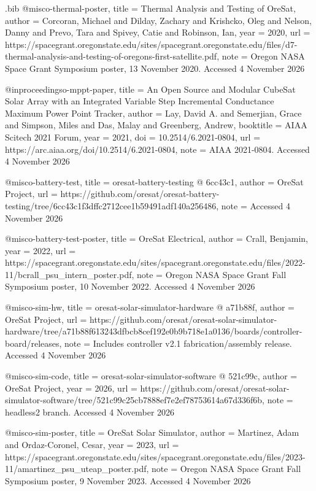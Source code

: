 \begin{filecontents*}[overwrite]{\jobname.bib}
@misc{o-thermal-poster,
  title = {{Thermal Analysis and Testing of OreSat}},
  author = {Corcoran, Michael and Dilday, Zachary and Krishcko, Oleg and Nelson, Danny and Prevo, Tara and Spivey, Catie and Robinson, Ian},
  year = {2020},
  url = {https://spacegrant.oregonstate.edu/sites/spacegrant.oregonstate.edu/files/d7-thermal-analysis-and-testing-of-oregons-first-satellite.pdf},
  note = {Oregon NASA Space Grant Symposium poster, 13 November 2020. Accessed 4 November 2026}
}

@inproceedings{o-mppt-paper,
  title = {{An Open Source and Modular CubeSat Solar Array with an Integrated Variable Step Incremental Conductance Maximum Power Point Tracker}},
  author = {Lay, David A. and Semerjian, Grace and Simpson, Miles and Das, Malay and Greenberg, Andrew},
  booktitle = {AIAA Scitech 2021 Forum},
  year = {2021},
  doi = {10.2514/6.2021-0804},
  url = {https://arc.aiaa.org/doi/10.2514/6.2021-0804},
  note = {AIAA 2021-0804. Accessed 4 November 2026}
}

@misc{o-battery-test,
  title = {{oresat-\allowbreak{}battery-\allowbreak{}testing @ 6cc43c1}},
  author = {{OreSat Project}},
  url = {https://github.com/oresat/oresat-battery-testing/tree/6cc43c1f3dffc2712cee1b59491adf140a256486},
  note = {Accessed 4 November 2026}
}

@misc{o-battery-test-poster,
  title = {{OreSat Electrical}},
  author = {Crall, Benjamin},
  year = {2022},
  url = {https://spacegrant.oregonstate.edu/sites/spacegrant.oregonstate.edu/files/2022-11/bcrall_psu_intern_poster.pdf},
  note = {Oregon NASA Space Grant Fall Symposium poster, 10 November 2022. Accessed 4 November 2026}
}

@misc{o-sim-hw,
  title = {{oresat-\allowbreak{}solar-\allowbreak{}simulator-\allowbreak{}hardware @ a71b88f}},
  author = {{OreSat Project}},
  url = {https://github.com/oresat/oresat-solar-simulator-hardware/tree/a71b88f613243dfbcb8cef192e0b9b718e1a0136/boards/controller-board/releases},
  note = {Includes controller v2.1 fabrication/assembly release. Accessed 4 November 2026}
}

@misc{o-sim-code,
  title = {{oresat-\allowbreak{}solar-\allowbreak{}simulator-\allowbreak{}software @ 521c99c}},
  author = {{OreSat Project}},
  year = {2026},
  url = {https://github.com/oresat/oresat-solar-simulator-software/tree/521c99c25cb7888ef7e2ef78753614a67d336f6b},
  note = {headless2 branch. Accessed 4 November 2026}
}

@misc{o-sim-poster,
  title = {{OreSat Solar Simulator}},
  author = {Martinez, Adam and Ordaz-Coronel, Cesar},
  year = {2023},
  url = {https://spacegrant.oregonstate.edu/sites/spacegrant.oregonstate.edu/files/2023-11/amartinez_psu_uteap_poster.pdf},
  note = {Oregon NASA Space Grant Fall Symposium poster, 9 November 2023. Accessed 4 November 2026}
}


\end{filecontents*}
